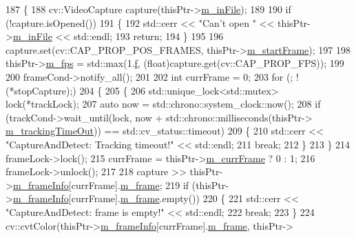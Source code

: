 \begin{DoxyCode}
187 \{
188     cv::VideoCapture capture(thisPtr->\mbox{\hyperlink{class_video_example_ac536e84dec6f9be505779689322b42ca}{m\_inFile}});
189 
190     \textcolor{keywordflow}{if} (!capture.isOpened())
191     \{
192         std::cerr << \textcolor{stringliteral}{"Can't open "} << thisPtr->\mbox{\hyperlink{class_video_example_ac536e84dec6f9be505779689322b42ca}{m\_inFile}} << std::endl;
193         \textcolor{keywordflow}{return};
194     \}
195 
196     capture.set(cv::CAP\_PROP\_POS\_FRAMES, thisPtr->\mbox{\hyperlink{class_video_example_a98dbe94b8827c5a1898e3a9423cce402}{m\_startFrame}});
197 
198     thisPtr->\mbox{\hyperlink{class_video_example_ae8110012f8d57f39d6355377cf20fb27}{m\_fps}} = std::max(1.\mbox{\hyperlink{rings_8cpp_a77369fc4d5326a16d2c603e032023528}{f}}, (\textcolor{keywordtype}{float})capture.get(cv::CAP\_PROP\_FPS));
199 
200     frameCond->notify\_all();
201 
202     \textcolor{keywordtype}{int} currFrame = 0;
203     \textcolor{keywordflow}{for} (; !(*stopCapture);)
204     \{
205         \{
206             std::unique\_lock<std::mutex> lock(*trackLock);
207             \textcolor{keyword}{auto} now = std::chrono::system\_clock::now();
208             \textcolor{keywordflow}{if} (trackCond->wait\_until(lock, now + std::chrono::milliseconds(thisPtr->
      \mbox{\hyperlink{class_video_example_a47c8dd1d6ec7e8e18a8f7d92536c53a2}{m\_trackingTimeOut}})) == std::cv\_status::timeout)
209             \{
210                 std::cerr << \textcolor{stringliteral}{"CaptureAndDetect: Tracking timeout!"} << std::endl;
211                 \textcolor{keywordflow}{break};
212             \}
213         \}
214         frameLock->lock();
215         currFrame = thisPtr->\mbox{\hyperlink{class_video_example_a4adccbe4084f68f10d966901b168a98a}{m\_currFrame}} ? 0 : 1;
216         frameLock->unlock();
217 
218         capture >> thisPtr->\mbox{\hyperlink{class_video_example_af5363ad3ed9a34bd105dbdaf274acb66}{m\_frameInfo}}[currFrame].\mbox{\hyperlink{struct_video_example_1_1_frame_info_ace63373cca952f2c7f281b18220f9f8c}{m\_frame}};
219         \textcolor{keywordflow}{if} (thisPtr->\mbox{\hyperlink{class_video_example_af5363ad3ed9a34bd105dbdaf274acb66}{m\_frameInfo}}[currFrame].\mbox{\hyperlink{struct_video_example_1_1_frame_info_ace63373cca952f2c7f281b18220f9f8c}{m\_frame}}.empty())
220         \{
221             std::cerr << \textcolor{stringliteral}{"CaptureAndDetect: frame is empty!"} << std::endl;
222             \textcolor{keywordflow}{break};
223         \}
224         cv::cvtColor(thisPtr->\mbox{\hyperlink{class_video_example_af5363ad3ed9a34bd105dbdaf274acb66}{m\_frameInfo}}[currFrame].\mbox{\hyperlink{struct_video_example_1_1_frame_info_ace63373cca952f2c7f281b18220f9f8c}{m\_frame}}, thisPtr->

\end{DoxyCode}
